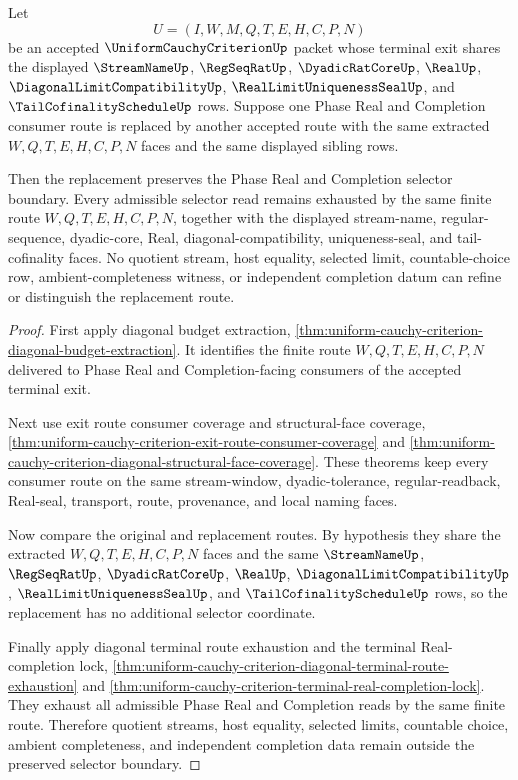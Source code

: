\begin{theorem}
\label{thm:uniform-cauchy-criterion-real-completion-selector-route-stability}
Let
$$
U=(I,W,M,Q,T,E,H,C,P,N)
$$
be an accepted $\UniformCauchyCriterionUp$ packet whose terminal exit shares the displayed $\StreamNameUp$, $\RegSeqRatUp$, $\DyadicRatCoreUp$, $\RealUp$, $\DiagonalLimitCompatibilityUp$, $\RealLimitUniquenessSealUp$, and $\TailCofinalityScheduleUp$ rows. Suppose one Phase Real and Completion consumer route is replaced by another accepted route with the same extracted $W,Q,T,E,H,C,P,N$ faces and the same displayed sibling rows.

Then the replacement preserves the Phase Real and Completion selector boundary. Every admissible selector read remains exhausted by the same finite route $W,Q,T,E,H,C,P,N$, together with the displayed stream-name, regular-sequence, dyadic-core, Real, diagonal-compatibility, uniqueness-seal, and tail-cofinality faces. No quotient stream, host equality, selected limit, countable-choice row, ambient-completeness witness, or independent completion datum can refine or distinguish the replacement route.
\end{theorem}
\begin{proof}
First apply diagonal budget extraction, \autoref{thm:uniform-cauchy-criterion-diagonal-budget-extraction}. It identifies the finite route $W,Q,T,E,H,C,P,N$ delivered to Phase Real and Completion-facing consumers of the accepted terminal exit.

Next use exit route consumer coverage and structural-face coverage, \autoref{thm:uniform-cauchy-criterion-exit-route-consumer-coverage} and \autoref{thm:uniform-cauchy-criterion-diagonal-structural-face-coverage}. These theorems keep every consumer route on the same stream-window, dyadic-tolerance, regular-readback, Real-seal, transport, route, provenance, and local naming faces.

Now compare the original and replacement routes. By hypothesis they share the extracted $W,Q,T,E,H,C,P,N$ faces and the same $\StreamNameUp$, $\RegSeqRatUp$, $\DyadicRatCoreUp$, $\RealUp$, $\DiagonalLimitCompatibilityUp$, $\RealLimitUniquenessSealUp$, and $\TailCofinalityScheduleUp$ rows, so the replacement has no additional selector coordinate.

Finally apply diagonal terminal route exhaustion and the terminal Real-completion lock, \autoref{thm:uniform-cauchy-criterion-diagonal-terminal-route-exhaustion} and \autoref{thm:uniform-cauchy-criterion-terminal-real-completion-lock}. They exhaust all admissible Phase Real and Completion reads by the same finite route. Therefore quotient streams, host equality, selected limits, countable choice, ambient completeness, and independent completion data remain outside the preserved selector boundary.
\end{proof}

